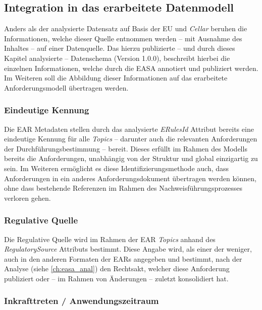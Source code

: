 \subsection{Integration in das erarbeitete Datenmodell}

    Anders als der analysierte Datensatz auf Basis der \ac{EU} und \textit{Cellar} beruhen die Informationen, welche dieser Quelle entnommen werden -- mit Ausnahme des Inhaltes -- auf einer Datenquelle.
    Das hierzu publizierte -- und durch dieses Kapitel analysierte -- Datenschema (Version 1.0.0), beschreibt hierbei die einzelnen Informationen, welche durch die \ac{EASA} annotiert und publiziert werden.
    Im Weiteren soll die Abbildung dieser Informationen auf das erarbeitete Anforderungsmodell übertragen werden.
    
\subsubsection{Eindeutige Kennung}
    
    Die \ac{EAR} Metadaten stellen durch das analysierte \textit{ERulesId} Attribut bereits eine eindeutige Kennung für alle \textit{Topics} -- darunter auch die relevanten Anforderungen der Durchführungsbestimmung -- bereit.
    Dieses erfüllt im Rahmen des Modells bereits die Anforderungen, unabhängig von der Struktur und global einzigartig zu sein. 
    Im Weiteren ermöglicht es diese Identifizierungsmethode auch, dass Anforderungen in ein anderes Anforderungsdokument übertragen werden können, ohne dass bestehende Referenzen im Rahmen des Nachweisführungsprozesses verloren gehen.
    
\subsubsection{Regulative Quelle}
    
    Die Regulative Quelle wird im Rahmen der \ac{EAR} \textit{Topics} anhand des \textit{RegulatorySource} Attributs bestimmt. 
    Diese Angabe wird, als einer der weniger, auch in den anderen Formaten der \acp{EAR} angegeben und bestimmt, nach der Analyse (siehe \ref{ch:easa_anal}) den Rechtsakt, welcher diese Anforderung publiziert oder -- im Rahmen von Änderungen -- zuletzt konsolidiert hat. 
    
\pagebreak
\subsubsection{Inkrafttreten / Anwendungszeitraum}
    
